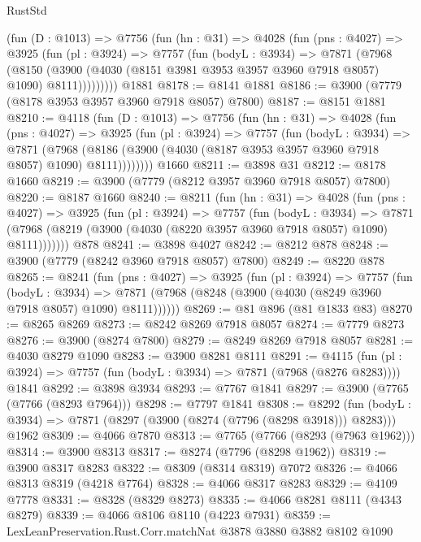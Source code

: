 \begin{lexlean}{RustStd}
\begin{coremodule}
      (fun (D : @1013) =>
      @7756
        (fun (hn : @31) =>
        @4028
          (fun (pns : @4027) =>
          @3925
            (fun (pl : @3924) =>
            @7757
              (fun (bodyL : @3934) =>
              @7871
                (@7968
                  (@8150
                    (@3900 (@4030 (@8151 @3981 @3953 @3957 @3960 @7918 @8057) @1090) @8111)))))))))
    @1881
@8178 := @8141 @1881
@8186 := @3900 (@7779 (@8178 @3953 @3957 @3960 @7918 @8057) @7800)
@8187 := @8151 @1881
@8210 := @4118
    (fun (D : @1013) =>
    @7756
      (fun (hn : @31) =>
      @4028
        (fun (pns : @4027) =>
        @3925
          (fun (pl : @3924) =>
          @7757
            (fun (bodyL : @3934) =>
            @7871
              (@7968 (@8186 (@3900 (@4030 (@8187 @3953 @3957 @3960 @7918 @8057) @1090) @8111))))))))
    @1660
@8211 := @3898 @31
@8212 := @8178 @1660
@8219 := @3900 (@7779 (@8212 @3957 @3960 @7918 @8057) @7800)
@8220 := @8187 @1660
@8240 := @8211
    (fun (hn : @31) =>
    @4028
      (fun (pns : @4027) =>
      @3925
        (fun (pl : @3924) =>
        @7757
          (fun (bodyL : @3934) =>
          @7871 (@7968 (@8219 (@3900 (@4030 (@8220 @3957 @3960 @7918 @8057) @1090) @8111)))))))
    @878
@8241 := @3898 @4027
@8242 := @8212 @878
@8248 := @3900 (@7779 (@8242 @3960 @7918 @8057) @7800)
@8249 := @8220 @878
@8265 := @8241
    (fun (pns : @4027) =>
    @3925
      (fun (pl : @3924) =>
      @7757
        (fun (bodyL : @3934) =>
        @7871 (@7968 (@8248 (@3900 (@4030 (@8249 @3960 @7918 @8057) @1090) @8111))))))
@8269 := @81 @896 (@81 @1833 @83)
@8270 := @8265 @8269
@8273 := @8242 @8269 @7918 @8057
@8274 := @7779 @8273
@8276 := @3900 (@8274 @7800)
@8279 := @8249 @8269 @7918 @8057
@8281 := @4030 @8279 @1090
@8283 := @3900 @8281 @8111
@8291 := @4115
    (fun (pl : @3924) => @7757 (fun (bodyL : @3934) => @7871 (@7968 (@8276 @8283))))
    @1841
@8292 := @3898 @3934
@8293 := @7767 @1841
@8297 := @3900 (@7765 (@7766 (@8293 @7964)))
@8298 := @7797 @1841
@8308 := @8292
    (fun (bodyL : @3934) => @7871 (@8297 (@3900 (@8274 (@7796 (@8298 @3918))) @8283)))
    @1962
@8309 := @4066 @7870
@8313 := @7765 (@7766 (@8293 (@7963 @1962)))
@8314 := @3900 @8313
@8317 := @8274 (@7796 (@8298 @1962))
@8319 := @3900 @8317 @8283
@8322 := @8309 (@8314 @8319) @7072
@8326 := @4066 @8313 @8319 (@4218 @7764)
@8328 := @4066 @8317 @8283
@8329 := @4109 @7778
@8331 := @8328 (@8329 @8273)
@8335 := @4066 @8281 @8111 (@4343 @8279)
@8339 := @4066 @8106 @8110 (@4223 @7931)
@8359 := LexLeanPreservation.Rust.Corr.matchNat
    @3878
    @3880
    @3882
    @8102
    @1090

\end{coremodule}
\end{lexlean}
